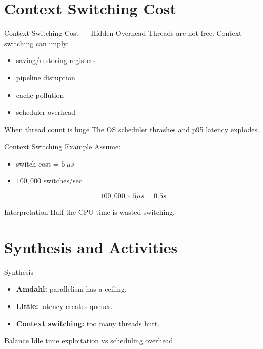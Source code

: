 \documentclass[11pt]{beamer}
\begin{document}
	\section{Context Switching Cost}
	
	\begin{frame}{Context Switching Cost --- Hidden Overhead}
		Threads are not free. Context switching can imply:
		\begin{itemize}
			\item saving/restoring registers
			\item pipeline disruption
			\item cache pollution
			\item scheduler overhead
		\end{itemize}
		

		\begin{alertblock}{When thread count is huge}
			The OS scheduler thrashes and p95 latency explodes.
		\end{alertblock}
	\end{frame}
	
	\begin{frame}{Context Switching Example}
		Assume:
		\begin{itemize}
			\item switch cost = $5~\mu s$
			\item $100{,}000$ switches/sec
		\end{itemize}
		

		\[
		100{,}000 \times 5\mu s = 0.5s
		\]
		

		\begin{alertblock}{Interpretation}
			Half the CPU time is wasted switching.
		\end{alertblock}
	\end{frame}
	
	\section{Synthesis and Activities}
	
	\begin{frame}{Synthesis}
		\begin{itemize}
			\item \textbf{Amdahl:} parallelism has a ceiling.
			\item \textbf{Little:} latency creates queues.
			\item \textbf{Context switching:} too many threads hurt.
		\end{itemize}
		

		\begin{block}{Balance}
			Idle time exploitation \quad vs \quad scheduling overhead.
		\end{block}
	\end{frame}
	
\end{document}
